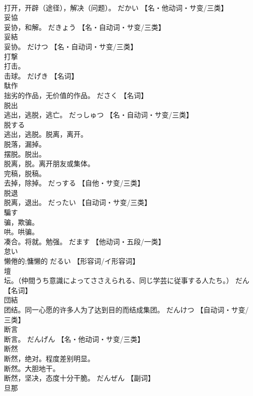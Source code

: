 \documentclass[8pt]{extreport}
\begin{document}
\begin{CJK}{UTF8}{min}
\\	打开，开辟（途径），解决（问题）。	だかい		【名・他动词・サ变/三类】
\\	妥協	
\\	妥协，和解。	だきょう		【名・自动词・サ变/三类】
\\	妥結	
\\	妥协。	だけつ		【名・自动词・サ变/三类】
\\	打撃	
\\	打击。 
\\	击球。	だげき		【名词】
\\	駄作	
\\	拙劣的作品，无价值的作品。	ださく		【名词】
\\	脱出	
\\	逃出，逃脱，逃亡。	だっしゅつ		【名・自动词・サ变/三类】
\\	脱する	
\\	逃出，逃脱。脱离，离开。 
\\	脱落，漏掉。 
\\	摆脱。脱出。 
\\	脱离，脱。离开朋友或集体。 
\\	完稿，脱稿。 
\\	去掉，除掉。	だっする		【自他・サ变/三类】
\\	脱退	
\\	脱离，退出。	だったい		【自动词・サ变/三类】
\\	騙す	
\\	骗，欺骗。 
\\	哄。哄骗。 
\\	凑合。将就。勉强。	だます		【他动词・五段/一类】
\\	怠い	
\\	懒倦的;慵懒的	だるい		【形容词/イ形容词】
\\	壇	
\\	坛。（仲間うち意識によってささえられる、同じ学芸に従事する人たち。）	だん		【名词】
\\	団結	
\\	团结。同一心愿的许多人为了达到目的而结成集团。	だんけつ		【自动词・サ变/三类】
\\	断言	
\\	断言。	だんげん		【名・他动词・サ变/三类】
\\	断然	
\\	断然，绝对。程度差别明显。 
\\	断然。大胆地干。 
\\	断然，坚决，态度十分干脆。	だんぜん		【副词】
\\	旦那	

\end{CJK}
\end{document}

